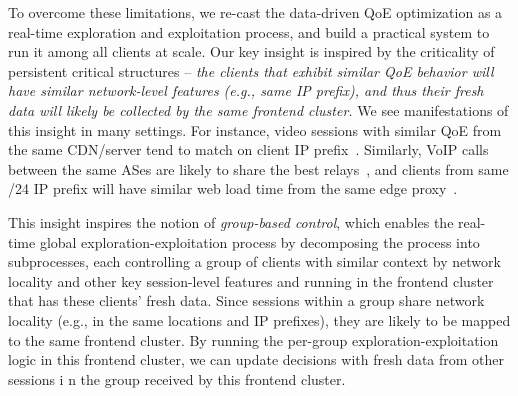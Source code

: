 To overcome these limitations, we re-cast the 
data-driven QoE  optimization as a real-time 
exploration and exploitation process, and build 
a practical system to run it among all clients at 
scale. 
Our key insight is inspired by the criticality of persistent critical
structures -- {\em the clients that exhibit similar 
QoE behavior will have similar network-level 
features (e.g., same IP prefix), and thus their 
fresh data will likely be collected by the same 
frontend cluster.}
We see manifestations of this insight in many 
settings.
For instance, video sessions with similar QoE 
from the same CDN/server tend to match on 
client IP prefix~\cite{cfa,cs2p}. 
Similarly, VoIP calls between the same ASes 
are likely to share the best
relays~\cite{via},  and clients from  same /24 
IP prefix will have
similar web load time from the same edge 
proxy~\cite{footprint}.

This insight inspires the notion of {\em group-based 
control}, which enables the real-time global 
exploration-exploitation process by decomposing 
the process into subprocesses, each controlling 
a group of clients with similar context by
network locality and other key session-level features 
and running in the frontend cluster that has these 
clients' fresh data.
Since sessions within a group share network locality (e.g., 
in the same locations and IP prefixes), 
they are likely to be mapped to the same frontend cluster.
By running the per-group exploration-exploitation 
logic in this frontend cluster, we can update
decisions with fresh data from other sessions i
n the group received by this frontend cluster.


